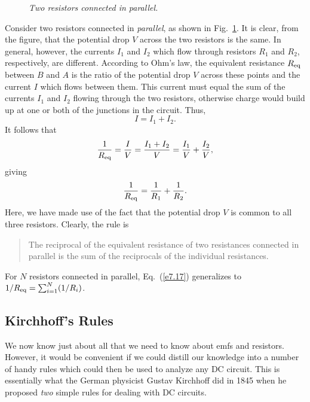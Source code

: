 \begin{figure}
\epsfysize=2in
\centerline{}
\caption{\em Two resistors connected in parallel.}\label{f7.3}
\end{figure}

Consider two resistors connected in {\em parallel}, as shown in Fig.~\ref{f7.3}. It
is clear, from the figure, that the potential drop $V$ across the two resistors is the
same. In general, however, the currents $I_1$ and $I_2$ which flow
through resistors $R_1$ and $R_2$, respectively, are different. 
According to Ohm's law, the equivalent resistance $R_{\rm eq}$
between $B$ and $A$ is the ratio of the potential drop
$V$ across these points and the current $I$
which flows between them. This current must equal the sum of the
currents $I_1$ and $I_2$ flowing through the two resistors, otherwise
charge would build up at one or both of the junctions in the circuit.
Thus,
\begin{equation}
I = I_1 + I_2.
\end{equation}
It follows that 
\begin{equation}
\frac{1}{R_{\rm eq}} = \frac{I}{V} = \frac{I_1+I_2}{V} = \frac{I_1}{V}
+\frac{I_2}{V},
\end{equation}
giving
\begin{equation}\label{e7.17}
\frac{1}{R_{\rm eq}} = \frac{1}{R_1} + \frac{1}{R_2}.
\end{equation}
Here, we have made use of the fact that the potential drop
$V$ is common to all three resistors. Clearly, the rule is
\begin{quote}
{\sf The reciprocal of the equivalent resistance of two resistances 
connected in parallel is the sum of the reciprocals of the
individual resistances.}
\end{quote}
For $N$ resistors connected in parallel, Eq.~(\ref{e7.17}) generalizes to
$1/R_{\rm eq} = \sum_{i=1}^N (1/R_i)$. 

\subsection{Kirchhoff's Rules} 
We now know just about all that we need to know about emfs and resistors. However, 
it would be convenient  if we could distill our knowledge into
a number of handy  rules which could then be used to analyze any DC circuit. 
This is essentially what the German physicist Gustav Kirchhoff did in 1845
when he proposed {\em two}\/ simple rules for dealing with DC circuits. 


